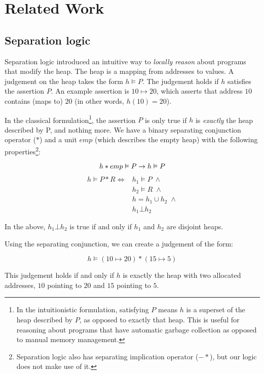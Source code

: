 \section{Related Work}

\subsection{Separation logic}
Separation logic\cite{reynolds2002separation} introduced an intuitive way to
\textit{locally reason} about programs that modify the heap. The heap is a
mapping from addresses to values. A judgement on the heap takes the form
$h \vDash P$. The judgement holds if $h$ satisfies the assertion $P$. An
example assertion is $10 \mapsto 20$, which asserts that address $10$ contains
(maps to) $20$ (in other words, $h(10) = 20$).

In the classical formulation\footnote{In the intuitionistic formulation,
satisfying $P$ means $h$ is a superset of the heap described by $P$, as opposed
to exactly that heap. This is useful for reasoning about programs that have
automatic garbage collection as opposed to manual memory management.}, the
assertion $P$ is only true if $h$ is \textit{exactly} the heap described by P,
and nothing more. We have a binary separating conjunction operator ($\ast$) and
a unit $emp$ (which describes the empty heap) with the following
properties\footnote{Separation logic also has separating implication operator
($-\!\!\ast$), but our logic does not make use of it.}:

\[
    h \ast emp \vDash P \rightarrow h \vDash P \\
\]
\begin{align*}
    h \vDash P \ast R \iff &h_1 \vDash P \; \wedge \\
		           &h_2 \vDash R \; \wedge \\
		           &h = h_1 \cup h_2 \; \wedge \\
			   &h_1 \bot h_2
\end{align*}

In the above, $h_1 \bot h_2$ is true if and only if $h_1$ and $h_2$ are disjoint heaps.


Using the separating conjunction, we can create a judgement of the form:

\[ h \vDash (10\mapsto20) * (15\mapsto5) \]

This judgement holds if and only if $h$ is exactly the heap with two allocated
addresses, $10$ pointing to $20$ and $15$ pointing to $5$.

